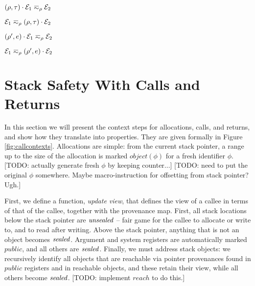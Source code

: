\documentclass[10pt,conference]{ieeetran}%
\theoremstyle{definition}
\begin{document}
\begin{minipage}{.4\columnwidth}
           {\((\rho,\tau) \cdot \mathcal{E}_1 \eqsim_\rho \mathcal{E}_2\)}
\end{minipage}
\begin{minipage}{.4\columnwidth}
           {\(\mathcal{E}_1 \eqsim_\rho (\rho,\tau) \cdot \mathcal{E}_2\)}
\end{minipage}

\begin{minipage}{.4\columnwidth}
           {\((\rho',e) \cdot \mathcal{E}_1 \eqsim_\rho \mathcal{E}_2\)}
\end{minipage}
\begin{minipage}{.4\columnwidth}
           {\(\mathcal{E}_1 \eqsim_\rho (\rho',e) \cdot \mathcal{E}_2\)}
\end{minipage}

\section{Stack Safety With Calls and Returns}

In this section we will present the context steps for allocations,
calls, and returns, and show how they
translate into properties. They are given formally in Figure \ref{fig:callcontexts}.
Allocations are simple: from the current stack pointer, a range up to the size of
the allocation is marked \(\mathit{object}(\phi)\) for a fresh identifier \(\phi\).
[TODO: actually generate fresh \(\phi\) by keeping counter...]
[TODO: need to put the original \(\phi\) somewhere. Maybe macro-instruction
  for offsetting from stack pointer? Ugh.]

First, we define a function, {\it update view}, that defines the view of a callee
in terms of that of the callee, together with the provenance map.
First, all stack locations below the stack pointer
are \(\mathit{unsealed}\) -- fair game for the callee to allocate or write to, and
to read after writing. Above the stack pointer, anything that is not an object
becomes \(\mathit{sealed}\). Argument and system registers are automatically marked
\(\mathit{public}\), and all others are \(\mathit{sealed}\).
Finally, we must address stack objects: we recursively identify all objects
that are reachable via pointer provenances found in \(\mathit{public}\)
registers and in reachable objects, and these retain their view, while
all others become \(\mathit{sealed}\). [TODO: implement \(\mathit{reach}\) to do this.]
\end{document}
